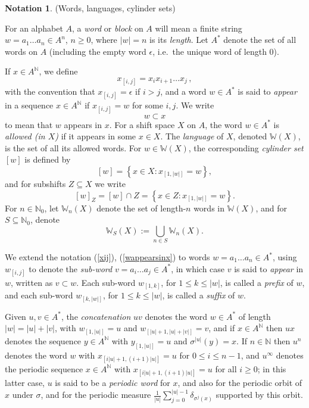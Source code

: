 \documentclass[reqno,11pt]{amsart}
\theoremstyle{definition}
\newtheorem{notation}[thm]{Notation}
\theoremstyle{remark}
\theoremstyle{remark}
\def \N {\mathbb N}
\def\w{\mathbb{W}}
\numberwithin{equation}{section}
\begin{document}
\begin{notation} (Words, languages, cylinder sets)

For an alphabet $A$, a \emph{word} or \emph{block} on $A$ will mean a finite string $w=a_1\ldots a_n \in A^n$, $n\ge 0$,
where $|w|=n$ is its \emph{length}.
Let $A^*$ denote the set of all words on $A$ (including the empty word $\epsilon$, i.e.~the unique word of length 0).

If $x\in A^\N$, we define
\begin{equation}\label{xij}
x_{[i,j]}=x_ix_{i+1}\ldots x_j\,,
\end{equation}
with the convention that $x_{[i,j]}=\epsilon$ if $i>j$, and
a word $w\in A^*$ is
said to \emph{appear} in a sequence $x \in A^\N$
if $x_{[i,j]} = w$ for some $i,j$.
We write
\begin{equation}\label{wappearsinx}
w\subset x
\end{equation}
to mean that $w$ appears in $x$.
For a shift space $X$ on $A$, the word $w\in A^*$ is \emph{allowed (in $X$)}
if it appears in some $x\in X$.
The \emph{language} of $X$, denoted $\w(X)$, is the set of all its allowed words.
For $w \in\w(X)$, the corresponding \emph{cylinder set} $[w]$ is defined
by
$$
[w]= \left\{x\in X: x_{[1,|w|]}=w\right\},
$$
and for subshifts $Z\subseteq X$ we write
$$
[w]_Z= [w]\cap Z =\left\{x\in Z: x_{[1,|w|]}=w\right\}.
$$
For $n\in \N_0$, let $\w_n(X)$ denote the set of length-$n$ words in $\w(X)$,
and for $S\subseteq\N_0$, denote
\begin{equation}\label{S_length_words}
\w_S(X):= \bigcup_{n\in S} \w_n(X).
\end{equation}

We extend the notation (\ref{xij}), (\ref{wappearsinx}) to words $w=a_1\ldots a_n\in A^*$, using
$w_{[i,j]}$ to denote the \emph{sub-word} $v=a_i\ldots a_j\in A^*$,
in which case $v$ is said to \emph{appear} in $w$,
written as $v\subset w$.
Each sub-word $w_{[1,k]}$, for $1\le k\le |w|$, is called a \emph{prefix} of $w$,
and each sub-word $w_{[k,|w|]}$, for $1\le k\le |w|$, is called a \emph{suffix} of $w$.

Given $u, v\in A^*$, the \emph{concatenation} $uv$ denotes the word $w\in A^*$ 
of length $|w|=|u|+|v|$, with $w_{[1,|u|]}=u$ and $w_{[|u|+1,|u|+|v| ]}=v$,
and if $x\in A^\N$ then $ux$ denotes the sequence $y\in A^\N$ with
$y_{[1,|u|]}=u$ and $\sigma^{|u|}(y)=x$.
If $n\in\N$ then $u^n$ denotes the word $w$ with $x_{[i|u|+1,(i+1)|u|]}=u$
for $0\le i\le n-1$,
and $u^\infty$ denotes the periodic sequence $x\in A^\N$ with $x_{[i|u|+1,(i+1)|u|]}=u$
for all $i\ge 0$; in this latter case, $u$ is said to be a \emph{periodic word} for $x$,
and also for the periodic orbit of $x$ under $\sigma$, and for the periodic measure
$ \frac{1}{|u|} \sum_{j=0}^{|u|-1} \delta_{\sigma^j(x)}$
 supported by this orbit.
\end{notation}
\end{document}

